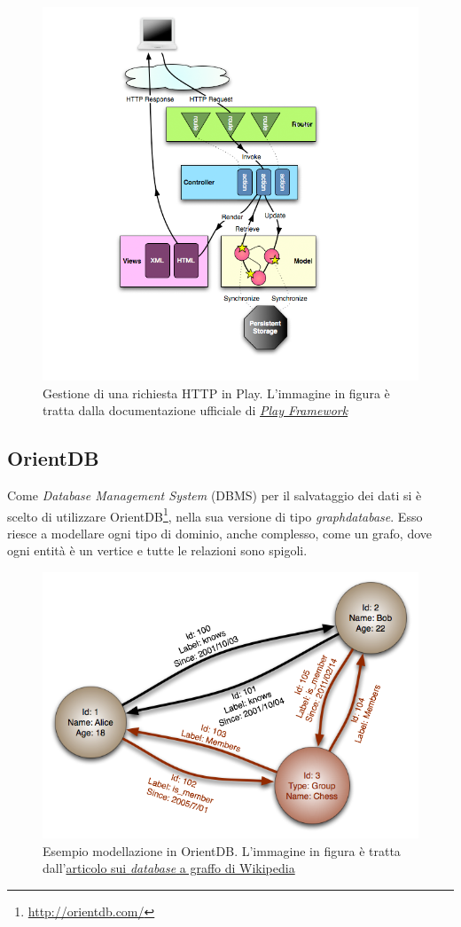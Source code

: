 \begin{figure}[h]
\centering
\includegraphics[width=0.7\linewidth]{immagini/diagrams_path}
\caption[Gestione di una richiesta HTTP in Play]{Gestione di una richiesta HTTP in Play. L'immagine in figura è tratta dalla documentazione ufficiale di \href{https://www.playframework.com/documentation/1.0/main}{\textit{Play Framework}}}
\label{fig:diagrams_path}
\end{figure}

\newpage
\subsection*{OrientDB}
Come \textit{Database Management System} (DBMS) per il salvataggio dei dati si è scelto di utilizzare OrientDB\footnote{\url{http://orientdb.com/}}, nella sua versione di tipo \textit{graphdatabase}. Esso riesce a modellare ogni tipo di dominio, anche complesso, come un grafo, dove ogni entità è un vertice e tutte le relazioni sono spigoli.
\begin{figure}[h]
\centering
\includegraphics[width=0.8\linewidth]{immagini/GraphDatabase_PropertyGraph}
\caption[Esempio modellazione in OrientDB]{Esempio modellazione in OrientDB. L'immagine in figura è tratta dall'\href{https://en.wikipedia.org/wiki/Graph_database}{articolo sui \textit{database} a graffo di Wikipedia}}
\label{fig:GraphDatabase_PropertyGraph}
\end{figure}

